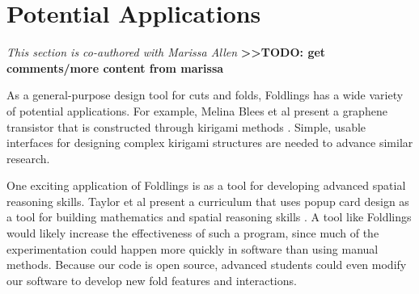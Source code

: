 \section{Potential Applications}\label{potential-applications}

\emph{This section is co-authored with Marissa Allen}
\textbf{\textgreater{}\textgreater{}TODO: get comments/more content from
marissa}

As a general-purpose design tool for cuts and folds, Foldlings has a
wide variety of potential applications. For example, Melina Blees et al
present a graphene transistor that is constructed through kirigami
methods \citet{blees2014graphene}. Simple, usable interfaces for
designing complex kirigami structures are needed to advance similar
research.

One exciting application of Foldlings is as a tool for developing
advanced spatial reasoning skills. Taylor et al present a curriculum
that uses popup card design as a tool for building mathematics and
spatial reasoning skills \citet{taylor2013think3d}
\citet{olson_mathematics_2004}. A tool like Foldlings would likely
increase the effectiveness of such a program, since much of the
experimentation could happen more quickly in software than using manual
methods. Because our code is open source, advanced students could even
modify our software to develop new fold features and interactions.
